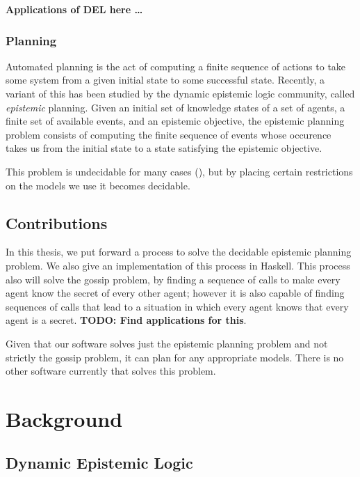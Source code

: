 \documentclass[12pt, a4paper]{article}
\begin{document}
\textbf{Applications of DEL here \ldots}

\subsubsection{Planning}

Automated planning is the act of computing a finite sequence of actions to take
some system from a given initial state to some successful state. Recently, a
variant of this has been studied by the dynamic epistemic logic community,
called \textit{epistemic} planning. Given an initial set of knowledge states of
a set of agents, a finite set of available events, and an epistemic objective,
the epistemic planning problem consists of computing the finite sequence of
events whose occurence takes us from the initial state to a state satisfying the
epistemic objective.

This problem is undecidable for many cases (\cite{UndecidabilityEP}), but by placing
certain restrictions on the models we use it becomes decidable.

\subsection{Contributions}

In this thesis, we put forward a process to solve the decidable epistemic planning
problem. We also give an implementation of this process in Haskell. This process
also will solve the gossip problem, by finding a sequence of calls to make every
agent know the secret of every other agent; however it is also capable of
finding sequences of calls that lead to a situation in which every agent knows
that every agent is a secret. \textbf{TODO: Find applications for this}. 

Given that our software solves just the epistemic planning problem and not
strictly the gossip problem, it can plan for any appropriate models. There is no
other software currently that solves this problem.  

\newpage

\section{Background}

\subsection{Dynamic Epistemic Logic}
\end{document}
